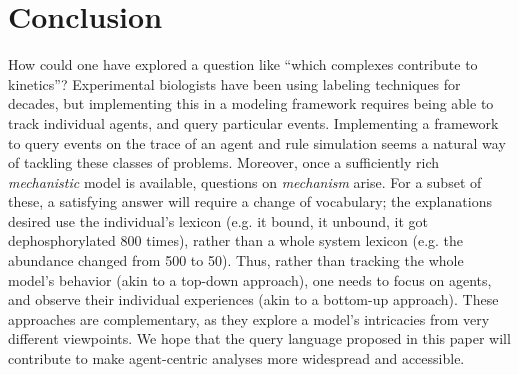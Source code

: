 \section{Conclusion}

How could one have explored a question like ``which complexes
contribute to kinetics''? Experimental biologists have been using
labeling techniques for decades, but implementing this in a modeling
framework requires being able to track individual agents, and query
particular events. Implementing a framework to query events on the
trace of an agent and rule simulation seems a natural way of tackling
these classes of problems. Moreover, once a sufficiently rich
\emph{mechanistic} model is available, questions on \emph{mechanism}
arise. For a subset of these, a satisfying answer will require a
change of vocabulary; the explanations desired use the individual's
lexicon (e.g. it bound, it unbound, it got dephosphorylated 800
times), rather than a whole system lexicon (e.g. the abundance changed
from 500 to 50). Thus, rather than tracking the whole model's behavior
(akin to a top-down approach), one needs to focus on agents, and
observe their individual experiences (akin to a bottom-up
approach). These approaches are complementary, as they explore a
model's intricacies from very different viewpoints. We hope that the
query language proposed in this paper will contribute to make
agent-centric analyses more widespread and accessible.
